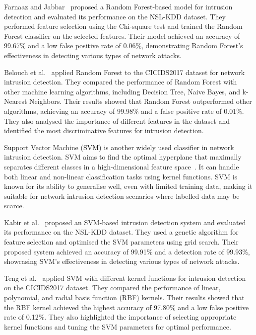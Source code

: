 Farnaaz and Jabbar~\cite{farnaaz2016random} proposed a Random Forest-based model for intrusion detection and evaluated its performance on the NSL-KDD dataset. They performed feature selection using the Chi-square test and trained the Random Forest classifier on the selected features. Their model achieved an accuracy of 99.67\% and a low false positive rate of 0.06\%, demonstrating Random Forest's effectiveness in detecting various types of network attacks.

Belouch et al.~\cite{belouch2018performance} applied Random Forest to the CICIDS2017 dataset for network intrusion detection. They compared the performance of Random Forest with other machine learning algorithms, including Decision Tree, Naive Bayes, and k-Nearest Neighbors. Their results showed that Random Forest outperformed other algorithms, achieving an accuracy of 99.98\% and a false positive rate of 0.01\%. They also analysed the importance of different features in the dataset and identified the most discriminative features for intrusion detection.

Support Vector Machine (SVM) is another widely used classifier in network intrusion detection. SVM aims to find the optimal hyperplane that maximally separates different classes in a high-dimensional feature space~\cite{cortes1995support}. It can handle both linear and non-linear classification tasks using kernel functions. SVM is known for its ability to generalise well, even with limited training data, making it suitable for network intrusion detection scenarios where labelled data may be scarce.

Kabir et al.~\cite{kabir2017network} proposed an SVM-based intrusion detection system and evaluated its performance on the NSL-KDD dataset. They used a genetic algorithm for feature selection and optimised the SVM parameters using grid search. Their proposed system achieved an accuracy of 99.91\% and a detection rate of 99.93\%, showcasing SVM's effectiveness in detecting various types of network attacks.

Teng et al.~\cite{teng2017svm} applied SVM with different kernel functions for intrusion detection on the CICIDS2017 dataset. They compared the performance of linear, polynomial, and radial basis function (RBF) kernels. Their results showed that the RBF kernel achieved the highest accuracy of 97.80\% and a low false positive rate of 0.12\%. They also highlighted the importance of selecting appropriate kernel functions and tuning the SVM parameters for optimal performance.

